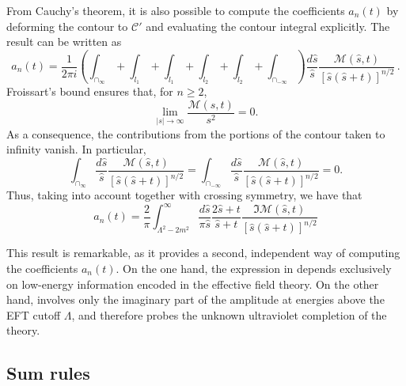 From Cauchy's theorem, it is also possible to compute the coefficients \( a_n(t) \) by deforming the contour to $\mathcal{C}'$ and evaluating the contour integral explicitly. The result can be written as
\begin{equation}
    a_n(t)
    =
    \frac{1}{2\pi i}
    \left(
        \int_{\cap_\infty}
        + \int_{l_1}
        + \int_{\tilde{l}_1}
        + \int_{l_2}
        + \int_{\tilde{l}_2}
        +  \int_{\cap_{-\infty}}
    \right) \frac{d\hat{s}}{\hat{s}}
    \frac{\mathcal{M}(\hat{s},t)}{[\hat{s}(\hat{s}+t)]^{n/2}} \, .
\end{equation}
Froissart’s bound ensures that, for $n \geq 2$, 
$$
\lim_{\left| s \right| \to \infty} \frac{\mathcal{M}(s, t)}{s^2} = 0.
$$
As a consequence, the contributions from the portions of the contour taken to infinity vanish. In particular,
\begin{equation}
    \int_{\cap_\infty} \frac{d\hat{s}}{\hat{s}}
    \frac{\mathcal{M}(\hat{s},t)}{[\hat{s}(\hat{s}+t)]^{n/2}}
    =
    \int_{\cap_{-\infty}} \frac{d\hat{s}}{\hat{s}}
    \frac{\mathcal{M}(\hat{s},t)}{[\hat{s}(\hat{s}+t)]^{n/2}}
    =
    0 .
\end{equation}
Thus, taking into account  together with crossing symmetry, we have that 
\begin{equation}
   a_n(t) = \frac{2}{\pi }\int_{\Lambda^2-2m^2}^{\infty} \frac{d \hat{s}}{\pi \hat{s}} \frac{2\hat{s}+t}{\hat{s}+t} \frac{\Im \mathcal{M}(\hat{s},t) }{[\hat{s}(\hat{s}+t)]^{n/2}} 
   \label{eq:highen}
\end{equation}

This result is remarkable, as it provides a second, independent way of computing the coefficients \( a_n(t) \). On the one hand, the expression in  depends exclusively on low-energy information encoded in the effective field theory. On the other hand,  involves only the imaginary part of the amplitude at energies above the EFT cutoff \( \Lambda \), and therefore probes the unknown ultraviolet completion of the theory.

\subsection{Sum rules}
\label{sec:sumrules}

